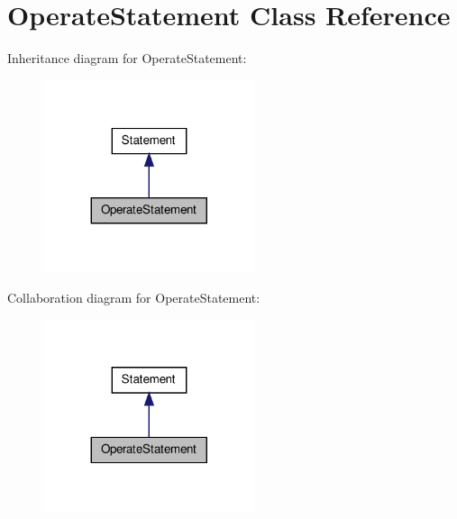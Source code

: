 \hypertarget{class_operate_statement}{\section{Operate\-Statement Class Reference}
\label{class_operate_statement}
}


Inheritance diagram for Operate\-Statement\-:
\nopagebreak
\begin{figure}[H]
\begin{center}
\leavevmode
\includegraphics[width=176pt]{class_operate_statement__inherit__graph}
\end{center}
\end{figure}


Collaboration diagram for Operate\-Statement\-:
\nopagebreak
\begin{figure}[H]
\begin{center}
\leavevmode
\includegraphics[width=176pt]{class_operate_statement__coll__graph}
\end{center}
\end{figure}
